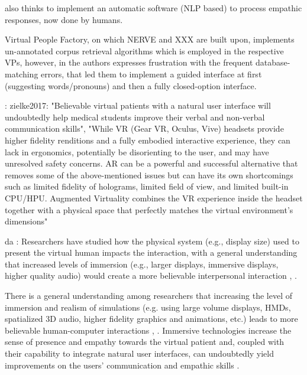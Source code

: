 \cite{foster2016using} also thinks to implement an automatic software (NLP based) to process empathic responses, now done by humans.

Virtual People Factory, on which NERVE \cite{hirumi2016advancing,Part2hirumi2016advancing,kleinsmith2015understanding} and XXX are built upon, implements un-annotated corpus retrieval algorithms \cite{lok2019can} which is employed in the respective VPs, however, in \cite{hirumi2016advancing} the authors expresses frustration with the frequent database-matching errors, that led them to implement a guided interface at first (suggesting words/pronouns) and then a fully closed-option interface.


: zielke2017: "Believable virtual patients with a natural user interface will
undoubtedly help medical students improve their verbal and
non-verbal communication skills", "While VR (Gear VR, Oculus, Vive) headsets provide
higher fidelity renditions and a fully embodied interactive
experience, they can lack in ergonomics, potentially be
disorienting to the user, and may have unresolved safety
concerns. AR can be a powerful and successful alternative that
removes some of the above-mentioned issues but can have its
own shortcomings such as limited fidelity of holograms, limited
field of view, and limited built-in CPU/HPU. Augmented
Virtuality combines the VR experience inside the headset
together with a physical space that perfectly matches the virtual
environment's dimensions"

da \cite{lok2019can}: Researchers have studied how the
physical system (e.g., display size) used to present the virtual human impacts the interaction, with a general understanding that increased levels of immersion (e.g., larger displays, immersive displays, higher quality audio) would create a more believable interpersonal interaction \cite{chuah2013exploring}, \cite{johnsen2008evaluation}.

There is a general understanding among researchers that increasing the level of immersion and realism of simulations (e.g. using large volume displays, HMDs, spatialized 3D audio, higher fidelity graphics and animations, etc.) leads to more believable human-computer interactions \cite{chuah2013exploring}, \cite{johnsen2008evaluation}. Immersive technologies increase the sense of presence and empathy towards the virtual patient \cite{ochs2019training} and, coupled with their capability to integrate natural user interfaces, can undoubtedly yield improvements on the users' communication and empathic skills \cite{zielke2017developing}.

